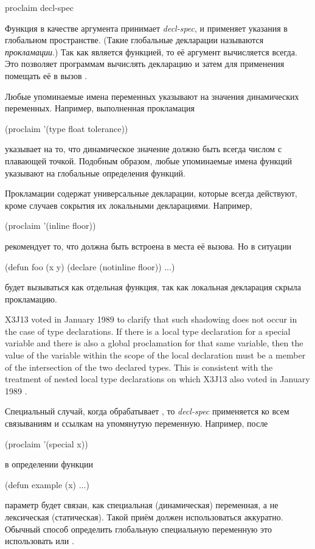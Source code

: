 \begin{defun}[Функция]
proclaim decl-spec

Функция  в качестве аргумента принимает \emph{decl-spec}, и
применяет указания в глобальном пространстве. (Такие глобальные декларации
называются \emph{прокламации}.)
Так как  является функцией, то её аргумент вычисляется всегда.
Это позволяет программам вычислять декларацию и затем для применения помещать её
в вызов .

Любые упоминаемые имена переменных указывают на значения
динамических переменных. Например, выполненная прокламация
\begin{lisp}
(proclaim '(type float tolerance))
\end{lisp}
указывает на то, что динамическое значение  должно быть всегда
числом с плавающей точкой.
Подобным образом, любые упоминаемые имена функций указывают на глобальные
определения функций.

Прокламации содержат универсальные декларации, которые всегда действуют, кроме
случаев сокрытия их локальными декларациями. Например,
\begin{lisp}
(proclaim '(inline floor))
\end{lisp}
рекомендует то, что  должна быть встроена в места её вызова. Но в
ситуации 
\begin{lisp}
(defun foo (x y) (declare (notinline floor)) ...)
\end{lisp}
 будет вызываться как отдельная функция, так как локальная декларация
скрыла прокламацию.

\begin{newer}
X3J13 voted in January 1989 
to clarify that such shadowing does not occur in the case of type declarations.
If there is a local type declaration for a special variable and there is also a global
proclamation for that same variable, then the value of the variable within the scope
of the local declaration must be a member of the intersection of the two
declared types.
This is consistent with the treatment of nested local type declarations
on which X3J13 also voted in January 1989 .
\end{newer}

Специальный случай, когда  обрабатывает , то
\emph{decl-spec} применяется ко всем связываниям и ссылкам на упомянутую 
переменную.
Например, после
\begin{lisp}
(proclaim '(special x))
\end{lisp}
в определении функции
\begin{lisp}
(defun example (x) ...)
\end{lisp}
параметр  будет связан, как специальная (динамическая) переменная, а не
лексическая (статическая). Такой приём должен использоваться аккуратно. Обычный
способ определить глобальную специальную переменную это использовать
 или .
\end{defun}

